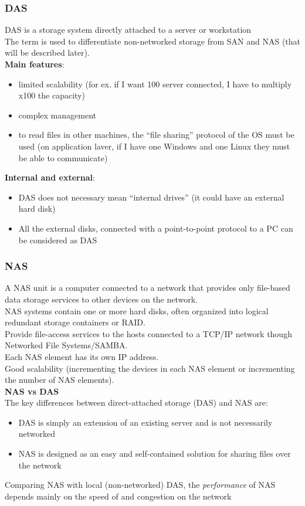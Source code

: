 \documentclass[10pt, oneside]{article}
\begin{document}
\subsubsection{DAS}
DAS is a storage system directly attached to a server or workstation\\
The term is used to differentiate non-networked storage from SAN and NAS (that will be described later).\\
{\bf Main features}:
\begin{itemize}
    \item limited scalability (for ex. if I want 100 server connected, I have to multiply x100 the capacity)
    \item complex management
    \item to read files in other machines, the “file sharing” protocol of the OS must be used (on application laver, if I have one Windows and one Linux they must be able to communicate)
\end{itemize}
{\bf Internal and external}:
\begin{itemize}
    \item DAS does not necessary mean “internal drives” (it could have an external hard disk)
    \item All the external disks, connected with a point-to-point protocol to a PC can be considered as DAS
\end{itemize}

\subsubsection{NAS}
A NAS unit is a computer connected to a network that provides only file-based data storage services to other devices on the network.\\
NAS systems contain one or more hard disks, often organized into logical redundant storage containers or RAID.\\
Provide file-access services to the hosts connected to a TCP/IP network though Networked File Systems/SAMBA.\\
Each NAS element has its own IP address.\\
Good scalability (incrementing the devices in each NAS element
or incrementing the number of NAS elements).\\
\newline
{\bf NAS vs DAS}\\
The key differences between direct-attached storage (DAS) and NAS are:
\begin{itemize}
    \item DAS is simply an extension of an existing server and is not necessarily networked
    \item NAS is designed as an easy and self-contained solution for sharing files over the network
\end{itemize}
Comparing NAS with local (non-networked) DAS, the {\sl performance} of NAS depends mainly on the speed of and congestion on the network
\end{document}
